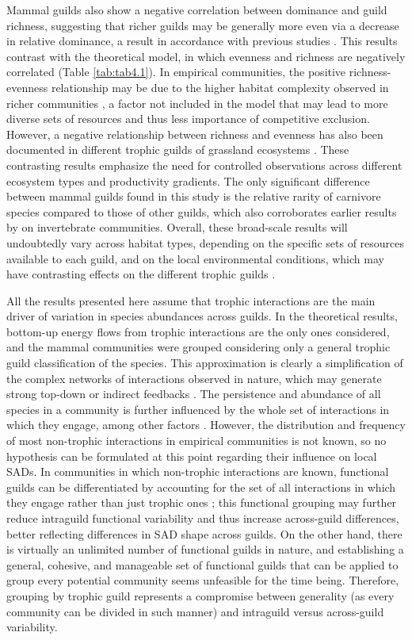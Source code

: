Mammal guilds also show a negative correlation between dominance and guild richness, suggesting that richer guilds may be generally more even via a decrease in relative dominance, a result in accordance with previous studies \citep{Spencer2000,Dornelas2011}. This results contrast with the theoretical model, in which evenness and richness are negatively correlated (Table \ref{tab:tab4.1}). In empirical communities, the positive richness-evenness relationship may be due to the higher habitat complexity observed in richer communities \citep{Hurlbert2004}, a factor not included in the model that may lead to more diverse sets of resources and thus less importance of competitive exclusion. However, a negative relationship between richness and evenness has also been documented in different trophic guilds of grassland ecosystems \citep{Bock2007}. These contrasting results emphasize the need for controlled observations across different ecosystem types and productivity gradients. The only significant difference between mammal guilds found in this study is the relative rarity of carnivore species compared to those of other guilds, which also corroborates earlier results by \cite{Spencer2000} on invertebrate communities. Overall, these broad-scale results will undoubtedly vary across habitat types, depending on the specific sets of resources available to each guild, and on the local environmental conditions, which may have contrasting effects on the different trophic guilds \citep{Voigt2003}.

All the results presented here assume that trophic interactions are the main driver of variation in species abundances across guilds. In the theoretical results, bottom-up energy flows from trophic interactions are the only ones considered, and the mammal communities were grouped considering only a general trophic guild classification of the species. This approximation is clearly a simplification of the complex networks of interactions observed in nature, which may generate strong top-down or indirect feedbacks \citep{Menge1995, Montoya2009a}. The persistence and abundance of all species in a community is further influenced by the whole set of interactions in which they engage, among other factors \citep{Pocock2012, Garcia-Callejas2018a}. However, the distribution and frequency of most non-trophic interactions in empirical communities is not known, so no hypothesis can be formulated at this point regarding their influence on local SADs. In communities in which non-trophic interactions are known, functional guilds can be differentiated by accounting for the set of all interactions in which they engage rather than just trophic ones \citep{Sander2015,Kefi2016a}; this functional grouping may further reduce intraguild functional variability and thus increase across-guild differences, better reflecting differences in SAD shape across guilds. On the other hand, there is virtually an unlimited number of functional guilds in nature, and establishing a general, cohesive, and manageable set of functional guilds that can be applied to group every potential community seems unfeasible for the time being. Therefore, grouping by trophic guild represents a compromise between generality (as every community can be divided in such manner) and intraguild versus across-guild variability.

